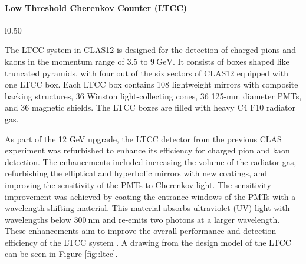 \paragraph{Low Threshold Cherenkov Counter (LTCC)}
\label{par::ltcc}
    \begin{wrapfigure}{l}{0.50\textwidth}
        \centering{}
        \caption[LTCC Mirror System]{Layout and components of the optical mirror system within each LTCC box from the design model.
        Source: \hyperlink{jlab.org/physics/hall-b/clas12}{CLAS12 wiki}.}
        \label{fig::ltcc}
    \end{wrapfigure}

    The LTCC system in CLAS12 is designed for the detection of charged pions and kaons in the momentum range of $3.5$ to $9 ~\text{GeV}$.
    It consists of boxes shaped like truncated pyramids, with four out of the six sectors of CLAS12 equipped with one LTCC box.
    Each LTCC box contains 108 lightweight mirrors with composite backing structures, 36 Winston light-collecting cones, 36 125-mm diameter PMTs, and 36 magnetic shields.
    The LTCC boxes are filled with heavy C4 F10 radiator gas.

    As part of the 12 GeV upgrade, the LTCC detector from the previous CLAS experiment was refurbished to enhance its efficiency for charged pion and kaon detection.
    The enhancements included increasing the volume of the radiator gas, refurbishing the elliptical and hyperbolic mirrors with new coatings, and improving the sensitivity of the PMTs to Cherenkov light.
    The sensitivity improvement was achieved by coating the entrance windows of the PMTs with a wavelength-shifting material.
    This material absorbs ultraviolet (UV) light with wavelengths below $300 ~\text{nm}$ and re-emits two photons at a larger wavelength.
    These enhancements aim to improve the overall performance and detection efficiency of the LTCC system \cite{ungaro2020}.
    A drawing from the design model of the LTCC can be seen in Figure \ref{fig::ltcc}.
